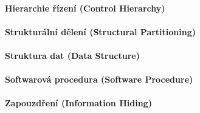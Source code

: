\paragraph{Hierarchie řízení (Control Hierarchy)}
\paragraph{Strukturální dělení (Structural Partitioning)}
\paragraph{Struktura dat (Data Structure)}
\paragraph{Softwarová procedura (Software Procedure)}
\paragraph{Zapouzdření (Information Hiding)}

